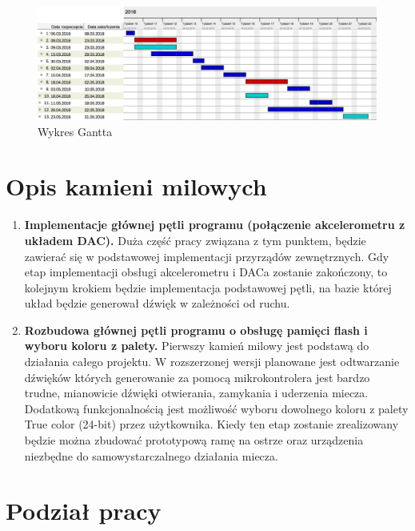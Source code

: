 \documentclass[10pt, a4paper]{article}
\begin{document}
	\begin{figure}[h]
	\centering
	\includegraphics[width=\linewidth]{gantt.png}
	\caption{Wykres Gantta}
	\end{figure}
	
	
	\section{Opis kamieni milowych}
	
	\begin{enumerate}
	
	\item \textbf{Implementacje głównej pętli programu (połączenie akcelerometru z układem DAC).}
	Duża część pracy związana z tym punktem, będzie zawierać się w podstawowej implementacji przyrządów zewnętrznych. Gdy etap implementacji obsługi akcelerometru i DACa zostanie zakończony, to kolejnym krokiem będzie implementacja podstawowej pętli, na bazie której układ będzie generował dźwięk w zależności od ruchu.
	
	\item \textbf{Rozbudowa głównej pętli programu o obsługę pamięci flash i wyboru koloru z palety.}
	Pierwszy kamień milowy jest podstawą do działania całego projektu. W rozszerzonej wersji planowane jest odtwarzanie dźwięków których generowanie za pomocą mikrokontrolera jest bardzo trudne, mianowicie dźwięki otwierania, zamykania i uderzenia miecza. Dodatkową funkcjonalnością jest możliwość wyboru dowolnego koloru z palety True color (24-bit) przez użytkownika. Kiedy ten etap zostanie zrealizowany będzie można zbudować prototypową ramę na ostrze oraz urządzenia niezbędne do samowystarczalnego działania miecza.
	
	\end{enumerate}
	
\newpage
\section{Podział pracy} %
	
\end{document}
